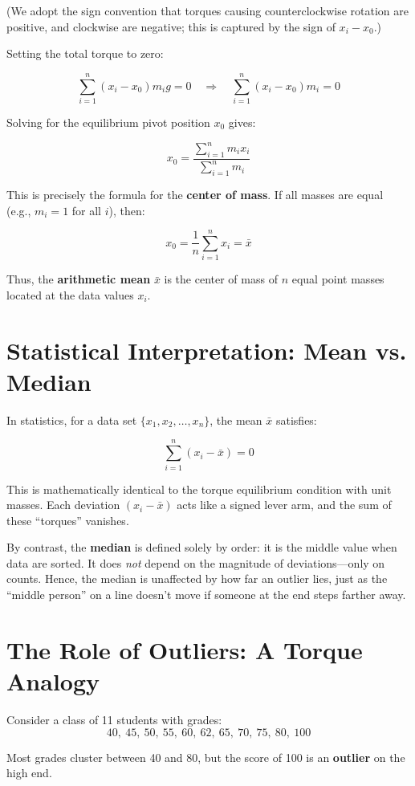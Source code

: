 \documentclass{article}
\begin{document}
(We adopt the sign convention that torques causing counterclockwise rotation are positive, and clockwise are negative; this is captured by the sign of $x_i - x_0$.)

Setting the total torque to zero:

\[
\sum_{i=1}^n (x_i - x_0) m_i g = 0
\quad \Rightarrow \quad
\sum_{i=1}^n (x_i - x_0) m_i = 0
\]

Solving for the equilibrium pivot position $x_0$ gives:

\[
x_0 = \frac{\sum_{i=1}^n m_i x_i}{\sum_{i=1}^n m_i}
\]

This is precisely the formula for the \textbf{center of mass}. If all masses are equal (e.g., $m_i = 1$ for all $i$), then:

\[
x_0 = \frac{1}{n} \sum_{i=1}^n x_i = \bar{x}
\]

Thus, the \textbf{arithmetic mean} $\bar{x}$ is the center of mass of $n$ equal point masses located at the data values $x_i$.

\section{Statistical Interpretation: Mean vs. Median}

In statistics, for a data set $\{x_1, x_2, \dots, x_n\}$, the mean $\bar{x}$ satisfies:

\[
\sum_{i=1}^n (x_i - \bar{x}) = 0
\]

This is mathematically identical to the torque equilibrium condition with unit masses. Each deviation $(x_i - \bar{x})$ acts like a signed lever arm, and the sum of these ``torques'' vanishes.

By contrast, the \textbf{median} is defined solely by order: it is the middle value when data are sorted. It does \textit{not} depend on the magnitude of deviations—only on counts. Hence, the median is unaffected by how far an outlier lies, just as the ``middle person'' on a line doesn’t move if someone at the end steps farther away.

\section{The Role of Outliers: A Torque Analogy}

Consider a class of 11 students with grades:
\[
40,\ 45,\ 50,\ 55,\ 60,\ 62,\ 65,\ 70,\ 75,\ 80,\ 100
\]

Most grades cluster between 40 and 80, but the score of 100 is an \textbf{outlier} on the high end.
\end{document}
